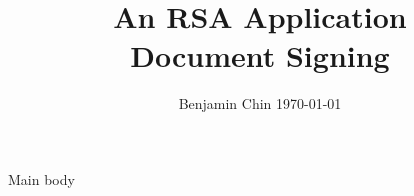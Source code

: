 \documentclass[11pt]{article}
\begin{document}
\title{An RSA Application\linebreak \\ \Large Document Signing}

\author{Benjamin Chin \today}
\date{} %

\maketitle

\maketitle


Main body
\end{document}
